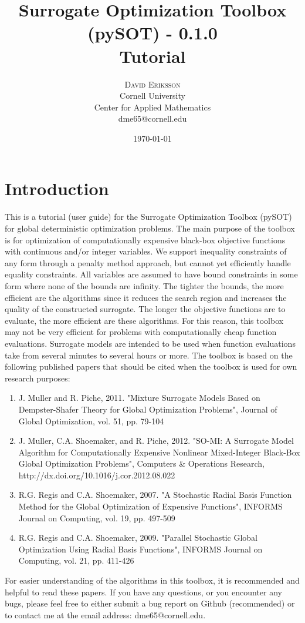\documentclass[]{article}
\title{\vspace{-15mm}%
	\fontsize{18pt}{10pt}\selectfont
	\textbf{Surrogate Optimization Toolbox (pySOT) - 0.1.0 \\ Tutorial}
	}
\author{%
	\Large\textsc{David Eriksson} \\[2mm]
		\normalsize	Cornell University \\
	\normalsize Center for Applied Mathematics \\
	\normalsize	dme65@cornell.edu \\ 
	}
\date{\today}
\begin{document}
\fontsize{12}{14}\rm

\maketitle
\thispagestyle{fancy}
\tableofcontents

\section{Introduction}
This is a tutorial (user guide) for the Surrogate Optimization Toolbox (pySOT) for global deterministic optimization problems. The main purpose of the toolbox is for optimization of computationally expensive black-box objective functions with continuous and/or integer variables. We support inequality constraints of any form through a penalty method approach, but cannot yet efficiently handle equality constraints. All variables are assumed to have bound constraints in some form where none of the bounds are infinity. The tighter the bounds, the more efficient are the algorithms since it reduces the search region and increases the quality of the constructed surrogate. The longer the objective functions are to evaluate, the more efficient are these algorithms. For this reason, this toolbox may not be very efficient for problems with computationally cheap function evaluations. Surrogate models are intended to be used when function evaluations take from several minutes to several hours or more. The toolbox is based on the following published papers that should be cited when the toolbox is used for own research purposes:
\begin{enumerate}
\item J. Muller and R. Piche, 2011. "Mixture Surrogate Models Based on Dempster-Shafer Theory for Global Optimization Problems", Journal of Global Optimization, vol. 51, pp. 79-104
\item J. Muller, C.A. Shoemaker, and R. Piche, 2012. "SO-MI: A Surrogate Model Algorithm for Computationally Expensive Nonlinear Mixed-Integer Black-Box Global Optimization Problems", Computers \& Operations Research, \\ http://dx.doi.org/10.1016/j.cor.2012.08.022
\item R.G. Regis and C.A. Shoemaker, 2007. "A Stochastic Radial Basis Function Method for the Global Optimization of Expensive Functions", INFORMS Journal on Computing, vol. 19, pp. 497-509
\item R.G. Regis and C.A. Shoemaker, 2009. "Parallel Stochastic Global Optimization Using Radial Basis Functions", INFORMS Journal on Computing, vol. 21, pp. 411-426
\end{enumerate}
For easier understanding of the algorithms in this toolbox, it is recommended and helpful to read these papers. If you have any questions, or you encounter any bugs, please feel free to either submit a bug report on Github (recommended) or to contact me at the email address: dme65@cornell.edu.
\end{document}
